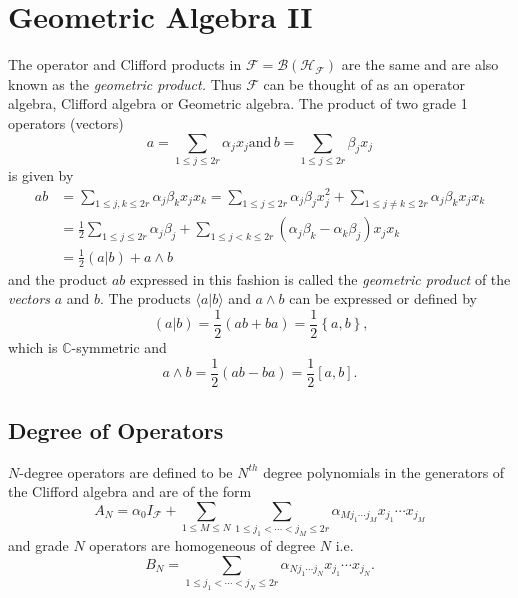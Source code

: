 \documentclass[aps, preprint]{revtex4}
\begin{document}
\section{Geometric Algebra II}
The operator and Clifford products in $\mathcal{F} =\mathcal{B} \left (\mathcal{H}_{\mathcal{F}}\right )$ are the same and are also known as the \emph{geometric product. }Thus $\mathcal{F}$ can be thought of as an operator algebra, Clifford algebra or Geometric algebra. The product of two grade 1 operators (vectors)
\begin{equation}a =\sum _{1 \leq j \leq 2 r}\alpha _{j} x_{j}\text{and}\,b =\sum _{1 \leq j \leq 2 r}\beta _{j} x_{j}
\end{equation}is given by
\begin{align}a b &  =\sum _{1 \leq j ,k \leq 2 r}\alpha _{j} \beta _{k} x_{j} x_{k} =\sum _{1 \leq j \leq 2 r}\alpha _{j} \beta _{j} x_{j}^{2} +\sum _{1 \leq j \neq k \leq 2 r}\alpha _{j} \beta _{k} x_{j} x_{k} \nonumber  \\
 &  =\frac{1}{2} \sum _{1 \leq j \leq 2 r}\alpha _{j} \beta _{j} +\sum _{1 \leq j <k \leq 2 r}\left (\alpha _{j} \beta _{k} -\alpha _{k} \beta _{j}\right ) x_{j} x_{k} \nonumber  \\
 &  =\frac{1}{2} \left (\left .a\right \vert b\right ) +a \wedge b\end{align}and the product $a b$ expressed in this fashion is called the \emph{geometric product }of the \emph{vectors} $a$ and $b\text{.}$ The products $ \langle \left .a\right \vert b \rangle $ and $a \wedge b$ can be expressed or defined by
\begin{equation*}\left (\left .a\right \vert b\right ) =\frac{1}{2} \left (a b +b a\right ) =\frac{1}{2} \left \{a ,b\right \}\text{,}
\end{equation*}which is $\mathbb{C}$-symmetric and
\begin{equation*}a \wedge b =\frac{1}{2} \left (a b -b a\right ) =\frac{1}{2} \left [a ,b\right ]\text{.}
\end{equation*}

\subsection{Degree of Operators}
$N$-degree operators are defined to be $N^{t h}$ degree polynomials in the generators of the Clifford algebra and are of the form
\begin{equation}A_{N} =\alpha _{0} I_{\mathcal{F}} +\sum _{1 \leq M \leq N}\sum _{1 \leq j_{1} <\cdots  <j_{M} \leq 2 r}\alpha _{M j_{1} \cdots  j_{M}} x_{j_{1}} \cdots  x_{j_{M}}
\end{equation}and grade $N$ operators are homogeneous of degree $N$ i.e.
\begin{equation}B_{N} =\sum _{1 \leq j_{1} <\cdots  <j_{N} \leq 2 r}\alpha _{N j_{1} \cdots  j_{N}} x_{j_{1}} \cdots  x_{j_{N}}\text{.}
\end{equation}
\end{document}
